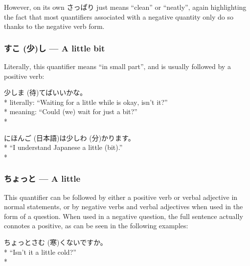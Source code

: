 \documentclass[11pt, b5paper, twoside, openright, onecolumn]{book}
\makeatletter
\newcommand*{\rubystack}[2]{{\relscale{0.5}%
  \begin{tabular}[b]{@{}c@{}}%
    {#1}\\%
   {\textscale{2}{#2}}%
  \end{tabular}}%
}
\DeclareRobustCommand*{\ruby}[2]{%
  \mbox{%
    \setlength{\parskip}{0ex}%
    \BeginAccSupp{method=pdfstringdef,ActualText={#1}}%
      \rubystack{\phantom{#2}}{#1}%
      \llap{%
        \rubystack{#2}{\phantom{#1}}%
      }%
    \EndAccSupp{}%
  }%
}
\renewcommand*{\ruby}[2]{#2 (#1)}%
\newenvironment{exampleblock}{
\setlength{\parindent}{0.6in}
\begin{minipage}[t]{\dimexpr\textwidth-\parindent}}
{\end{minipage}}
\makeatother
\begin{document}
However‚ on its own さっぱり just means “clean” or “neatly”‚ again highlighting the fact that most quantifiers associated with a negative quantity only do so thanks to the negative verb form.

\subsubsection{\ruby{少}{すこ}し — A little bit}

Literally‚ this quantifier means “in small part”‚ and is usually followed by a positive verb:

\vspace{0.4cm}
\begin{exampleblock}
少し\ruby{待}{ま}てばいいかな。 \\* 
literally: “Waiting for a little while is okay‚ isn’t it?” \\* 
meaning: “Could (we) wait for just a bit?” \\* 
\end{exampleblock}
\vspace{0.2cm}

\begin{exampleblock}
\ruby{日本語}{にほんご}は少し\ruby{分}{わ}かります。 \\* 
“I understand Japanese a little (bit).” \\* 
\end{exampleblock}
\subsubsection{ちょっと — A little}


This quantifier can be followed by either a positive verb or verbal adjective in normal statements‚ or by negative verbs and verbal adjectives when used in the form of a question. When used in a negative question‚ the full sentence actually connotes a positive‚ as can be seen in the following examples:

\vspace{0.4cm}
\begin{exampleblock}
ちょっと\ruby{寒}{さむ}くないですか。 \\* 
“Isn’t it a little cold?” \\* 
\end{exampleblock}
\vspace{0.2cm}
\end{document}
